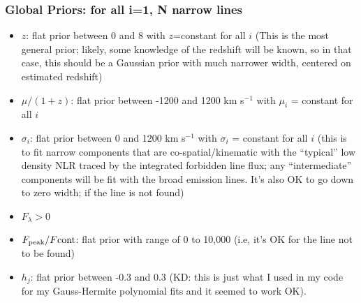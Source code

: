 \documentclass[12pt,letterpaper]{article}
\begin{document}
\subsubsection*{Global Priors: for all i=1, N narrow lines}
\begin{itemize}

  \item $z$: flat prior between 0 and 8 with $z$=constant for all $i$ (This is the most general prior; likely, some knowledge of the redshift will be known, so in that case, this should be a Gaussian prior with much narrower width, centered on estimated redshift)
  \item $\mu/(1+z)$: flat prior between -1200 and 1200 km s$^{-1}$ with $\mu_i$ = constant for all $i$
  \item $\sigma_i$: flat prior between 0 and 1200 km s$^{-1}$ with $\sigma_i$ = constant for all $i$ {\it} (this is to fit narrow components that are co-spatial/kinematic with the ``typical'' low density NLR traced by the integrated forbidden line flux; any ``intermediate'' components will be fit with the broad emission lines.  It's also OK to go down to zero width; if the line is not found)
 \item $F_{\lambda} > 0$
 \item $F_{\rm peak}/F{\rm cont}$: flat prior with range of 0 to 10,000 (i.e, it's OK for the line not to be found)
 \item $h_j$: flat prior between -0.3 and 0.3 (KD: this is just what I used in my code for my Gauss-Hermite polynomial fits and it seemed to work OK).

\end{itemize}
\end{document}
